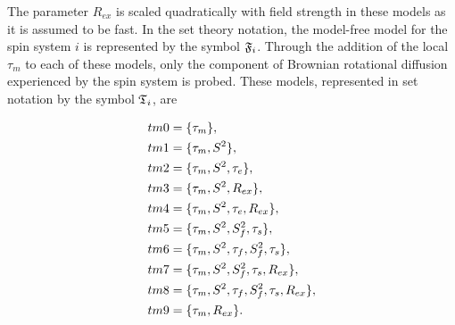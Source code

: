\noindent The parameter $R_{ex}$ is scaled quadratically with field strength in these models as it is assumed to be fast.
In the set theory notation, the model-free model for the spin system $i$ is represented by the symbol $\mathfrak{F}_i$.
Through the addition of the local $\tau_m$ to each of these models, only the component of Brownian rotational diffusion experienced by the spin system is probed.
These models, represented in set notation by the symbol $\mathfrak{T}_i$, are
\begin{latexonly}
\begin{subequations}
\renewcommand{\theequation}{\theparentequation .\arabic{equation}}
\addtocounter{equation}{-1}
\begin{align}
 tm0 &= \{\tau_m\},                                     \label{model: tm0} \\
 tm1 &= \{\tau_m, S^2\},                                \label{model: tm1} \\
 tm2 &= \{\tau_m, S^2, \tau_e\},                        \label{model: tm2} \\
 tm3 &= \{\tau_m, S^2, R_{ex}\},                        \label{model: tm3} \\
 tm4 &= \{\tau_m, S^2, \tau_e, R_{ex}\},                \label{model: tm4} \\
 tm5 &= \{\tau_m, S^2, S^2_f, \tau_s\},                 \label{model: tm5} \\
 tm6 &= \{\tau_m, S^2, \tau_f, S^2_f, \tau_s\},         \label{model: tm6} \\
 tm7 &= \{\tau_m, S^2, S^2_f, \tau_s, R_{ex}\},         \label{model: tm7} \\
 tm8 &= \{\tau_m, S^2, \tau_f, S^2_f, \tau_s, R_{ex}\}, \label{model: tm8} \\
 tm9 &= \{\tau_m, R_{ex}\}.                             \label{model: tm9}
\end{align}
\end{subequations}
\end{latexonly}
